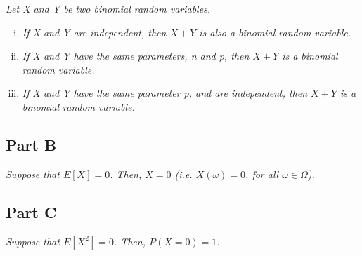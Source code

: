 \documentclass{article}
\begin{document}
\textit{Let X and Y be two binomial random variables.}

\begin{enumerate}[i.]
    \item \textit{If X and Y are independent, then $ X + Y $ is also a
    binomial random variable.}
    \item \textit{If X and Y have the same parameters, n and p, then $ X + Y
    $ is a binomial random variable.}
    \item \textit{If X and Y have the same parameter p, and are independent,
    then $ X + Y $ is a binomial random variable.}
\end{enumerate}

\subsection*{Part B}

\textit{Suppose that $ E[X] = 0 $. Then, $ X = 0 $ (i.e. $ X(\omega) = 0 $,
for all $ \omega \in \Omega $).}

\subsection*{Part C}

\textit{Suppose that $ E[X^2] = 0 $. Then, $ P(X = 0) = 1 $.}
\end{document}
